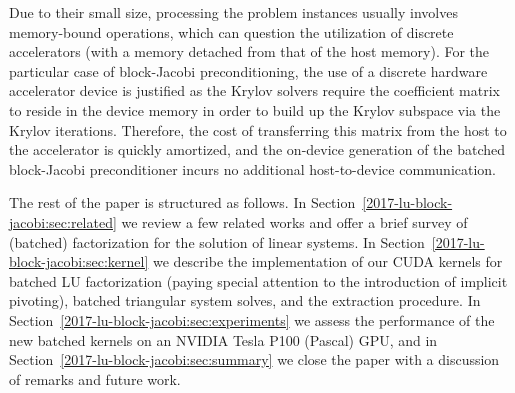 Due to their small size, processing the problem instances 
usually involves memory-bound operations, which can question the utilization of discrete accelerators
(with a memory detached from that of the host memory).
For the particular case of block-Jacobi preconditioning, 
the use of a discrete hardware accelerator device
is justified as the Krylov solvers require the coefficient matrix to reside in the device memory in order to build up the
Krylov subspace via the Krylov iterations. 
Therefore, the cost of transferring this matrix
from the host to the accelerator is quickly amortized,
and the on-device generation of the batched block-Jacobi preconditioner
incurs no additional host-to-device communication.

The rest of the paper is structured as follows. In Section~\ref{2017-lu-block-jacobi:sec:related} we review a few related works and offer
a brief survey of (batched) factorization for the solution of linear systems.
In Section~\ref{2017-lu-block-jacobi:sec:kernel} we describe the implementation of our CUDA kernels for batched LU factorization 
(paying special attention to the introduction of implicit pivoting),
batched triangular system solves, and the extraction procedure.
In Section~\ref{2017-lu-block-jacobi:sec:experiments}
we assess the performance of the new batched kernels on an NVIDIA Tesla P100 (Pascal) GPU,
and in Section~\ref{2017-lu-block-jacobi:sec:summary} we close the paper with a discussion of remarks and future work.
